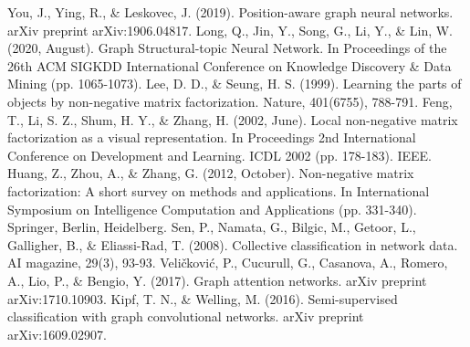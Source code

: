 \documentclass[onecolumn, conference]{IEEEtran}
\begin{document}

%
%
%

\begin{thebibliography}{00}
 You, J., Ying, R., \& Leskovec, J. (2019). Position-aware graph neural networks. arXiv preprint arXiv:1906.04817.
 Long, Q., Jin, Y., Song, G., Li, Y., \& Lin, W. (2020, August). Graph Structural-topic Neural Network. In Proceedings of the 26th ACM SIGKDD International Conference on Knowledge Discovery \& Data Mining (pp. 1065-1073).
 Lee, D. D., \& Seung, H. S. (1999). Learning the parts of objects by non-negative matrix factorization. Nature, 401(6755), 788-791.
 Feng, T., Li, S. Z., Shum, H. Y., \& Zhang, H. (2002, June). Local non-negative matrix factorization as a visual representation. In Proceedings 2nd International Conference on Development and Learning. ICDL 2002 (pp. 178-183). IEEE.
 Huang, Z., Zhou, A., \& Zhang, G. (2012, October). Non-negative matrix factorization: A short survey on methods and applications. In International Symposium on Intelligence Computation and Applications (pp. 331-340). Springer, Berlin, Heidelberg.
 Sen, P., Namata, G., Bilgic, M., Getoor, L., Galligher, B., \& Eliassi-Rad, T. (2008). Collective classification in network data. AI magazine, 29(3), 93-93.
 Veličković, P., Cucurull, G., Casanova, A., Romero, A., Lio, P., \& Bengio, Y. (2017). Graph attention networks. arXiv preprint arXiv:1710.10903.
 Kipf, T. N., \& Welling, M. (2016). Semi-supervised classification with graph convolutional networks. arXiv preprint arXiv:1609.02907.
\end{thebibliography}
\end{document}
